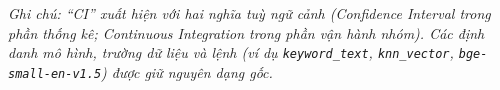 \vspace{-4pt}
{\footnotesize\itshape
Ghi chú: ``CI'' xuất hiện với hai nghĩa tuỳ ngữ cảnh (Confidence Interval trong phần thống kê;
Continuous Integration trong phần vận hành nhóm). Các định danh mô hình, trường dữ liệu và
lệnh (ví dụ \texttt{keyword\_text}, \texttt{knn\_vector}, \texttt{bge-small-en-v1.5}) được giữ nguyên dạng gốc.
\par}

